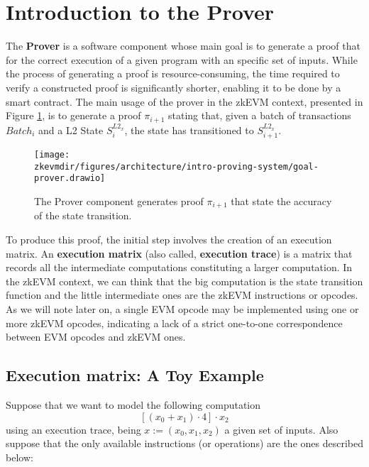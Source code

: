 


\section{Introduction to the Prover}
The \textbf{Prover} is a software component whose main goal is to generate a proof that for the correct execution of a given program with an specific set of inputs. While the process of generating a proof is resource-consuming, the time required to verify a constructed proof is significantly shorter, enabling it to be done by a smart contract. The main usage of the prover in the zkEVM context, presented in Figure \ref{fig:goal-prover}, is to generate a proof $\pi_{i+1}$ stating that, given a batch of transactions ${Batch}_i$ and a L2 State $S_i^{L2_x}$, the state has transitioned to $S_{i+1}^{L2_x}$.

\begin{figure}[H]
\centering
\texttt{[image: \\zkevmdir/figures/architecture/intro-proving-system/goal-prover.drawio]}
\caption{The Prover component generates proof $\pi_{i+1}$ that state the accuracy of the state transition.}
\label{fig:goal-prover}
\end{figure}

To produce this proof, the initial step involves the creation of an execution matrix. An \textbf{execution matrix} (also called, \textbf{execution trace}) is a matrix that records all the intermediate computations constituting a larger computation. In the zkEVM context, we can think that the big computation is the state transition function and the little intermediate ones are the zkEVM instructions or opcodes. As we will note later on, a single EVM opcode may be implemented using one or more zkEVM opcodes, indicating a lack of a strict one-to-one correspondence between EVM opcodes and zkEVM ones.


\subsection{Execution matrix: A Toy Example}

Suppose that we want to model the following computation
\[
[(x_0+x_1)\cdot 4] \cdot x_2
\]
using an execution trace, being $x := (x_0, x_1, x_2)$ a given set of inputs. Also suppose that the only available instructions (or operations) are the ones described below:

